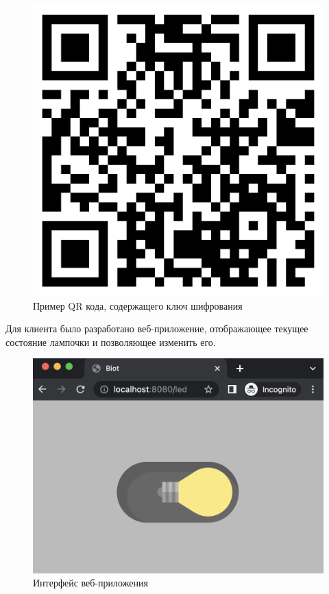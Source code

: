 	\begin{figure}[H]
		\centering
		\includegraphics[scale=0.15]{resources/private-key}
		\caption{Пример QR кода, содержащего ключ шифрования}
		\label{fig4.4}
	\end{figure}

	Для клиента было разработано веб-приложение, отображающее текущее состояние лампочки и позволяющее
	изменить его.
	
	\begin{figure}[h]
		\centering
		\includegraphics[scale=0.7]{resources/client-light-on}
		\caption{Интерфейс веб-приложения}
		\label{fig4.5}
	\end{figure}

